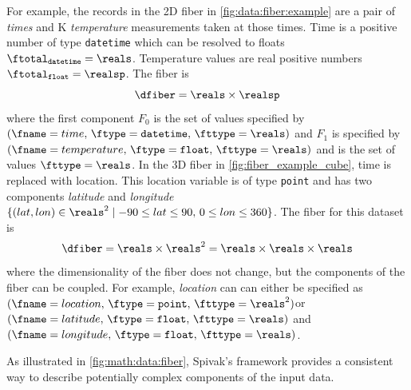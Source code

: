 \documentclass[../main.tex]{subfiles}
\begin{document}
For example, the records in the 2D fiber in \autoref{fig:data:fiber:example} are a pair of \textit{times} and \textdegree K \textit{temperature} measurements taken at those times. Time is a positive number of type \texttt{datetime} which can be resolved to floats $\ftotal_{\texttt{datetime}}= \reals$. Temperature values are real positive numbers $\ftotal_{\texttt{float}} = \realsp$. The fiber is 
\begin{equation*}
    \dfiber =  \reals \times \realsp 
\end{equation*} 
where the first component $F_0$ is the set of values specified by $(\fname=time,\, \ftype=\texttt{datetime},\, \fttype=\reals)$ and $F_1$ is specified by $(\fname=temperature,\, \ftype=\texttt{float},\, \fttype=\reals)$ and is the set of values $\fttype=\reals$. In the 3D fiber in \autoref{fig:fiber_example_cube}, time is replaced with location. This location variable is of type \texttt{point} and has two components \textit{latitude} and \textit{longitude} $\{(lat,lon) \in \reals^{2} \mid  -90\leq lat \leq 90,\, 0 \leq lon \leq 360\}$. The fiber for this dataset is
\begin{equation*}
    \dfiber = \reals \times \reals^{2} = \reals \times \reals \times \reals
\end{equation*} 
where the dimensionality of the fiber does not change, but the components of the fiber can be coupled. For example, \textit{location} can can either be specified as \((\fname = location,\, \ftype = \texttt{point},\, \fttype=\reals^{2})\)or \((\fname=latitude,\, \ftype=\texttt{float}, \, \fttype=\reals)\) and \((\fname=longitude,\, \ftype=\texttt{float},\,\fttype=\reals)\).  

As illustrated in \autoref{fig:math:data:fiber}, Spivak's framework provides a consistent way to describe potentially complex components of the input data. 
\end{document}
